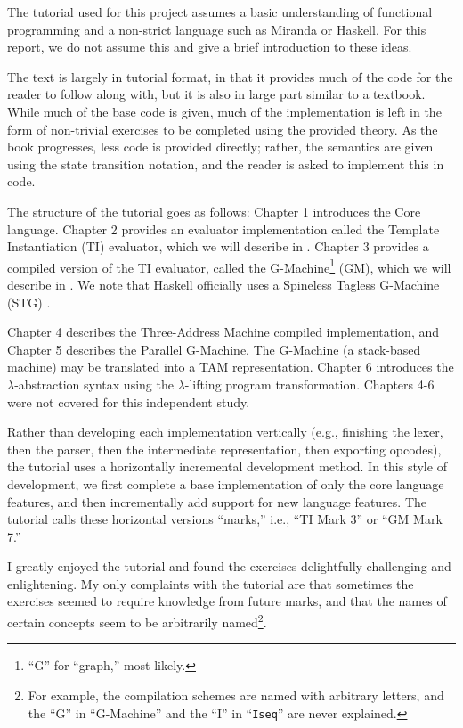 The tutorial used for this project assumes a basic understanding of functional programming and a non-strict language such as Miranda or Haskell. For this report, we do not assume this and give a brief introduction to these ideas.

The text is largely in tutorial format, in that it provides much of the code for the reader to follow along with, but it is also in large part similar to a textbook. While much of the base code is given, much of the implementation is left in the form of non-trivial exercises to be completed using the provided theory. As the book progresses, less code is provided directly; rather, the semantics are given using the state transition notation, and the reader is asked to implement this in code.

The structure of the tutorial goes as follows: Chapter 1 introduces the Core language. Chapter 2 provides an evaluator implementation called the Template Instantiation (TI) evaluator, which we will describe in . Chapter 3 provides a compiled version of the TI evaluator, called the G-Machine\footnote{``G'' for ``graph,'' most likely.} (GM), which we will describe in . We note that Haskell officially uses a Spineless Tagless G-Machine (STG) \cite{jones1992implementing}.

Chapter 4 describes the Three-Address Machine compiled implementation, and Chapter 5 describes the Parallel G-Machine. The G-Machine (a stack-based machine) may be translated into a TAM representation. Chapter 6 introduces the $\lambda$-abstraction syntax using the $\lambda$-lifting program transformation. Chapters 4-6 were not covered for this independent study.

Rather than developing each implementation vertically (e.g., finishing the lexer, then the parser, then the intermediate representation, then exporting opcodes), the tutorial uses a horizontally incremental development method. In this style of development, we first complete a base implementation of only the core language features, and then incrementally add support for new language features. The tutorial calls these horizontal versions ``marks,'' i.e., ``TI Mark 3'' or ``GM Mark 7.''

I greatly enjoyed the tutorial and found the exercises delightfully challenging and enlightening. My only complaints with the tutorial are that sometimes the exercises seemed to require knowledge from future marks, and that the names of certain concepts seem to be arbitrarily named\footnote{For example, the compilation schemes are named with arbitrary letters, and the ``G'' in ``G-Machine'' and the ``I'' in ``\texttt{Iseq}'' are never explained.}.

